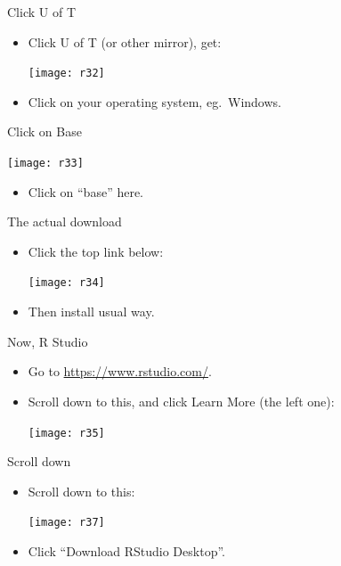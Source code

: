\documentclass[unknownkeysallowed]{beamer}\usepackage[]{graphicx}\usepackage[]{color}
\begin{document}
\begin{frame}[fragile]{Click U of T}
  
  \begin{itemize}
  \item Click U of T (or other mirror), get:
    
    \texttt{[image: r32]}
    
    \item Click on your operating system, eg.\ Windows.
  \end{itemize}
  
\end{frame}

\begin{frame}[fragile]{Click on Base}

      \texttt{[image: r33]}

  \begin{itemize}
  \item Click on ``base'' here.
  \end{itemize}
  
\end{frame}


\begin{frame}[fragile]{The actual download}
  
  \begin{itemize}
  \item Click the top link below:
    
    \texttt{[image: r34]}
    
  \item Then install usual way.
  \end{itemize}
  
\end{frame}


\begin{frame}[fragile]{Now, R Studio}
  
  \begin{itemize}
  \item Go to \url{https://www.rstudio.com/}.
  \item Scroll down to this, and click Learn More (the left one):
    
    \texttt{[image: r35]}
  \end{itemize}
  
\end{frame}

\begin{frame}[fragile]{Scroll down}
  
  \begin{itemize}
  \item Scroll down to this:
    
    \texttt{[image: r37]}
    
  \item Click ``Download RStudio Desktop''.
  \end{itemize}
  
\end{frame}
\end{document}
